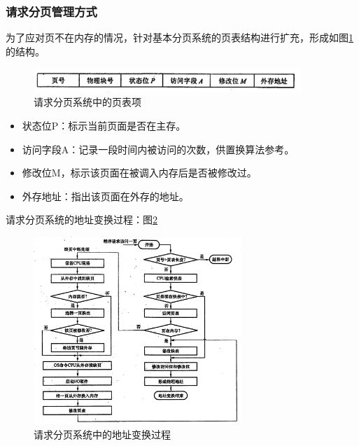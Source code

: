 \documentclass[12pt, a4paper, oneside]{ctexart}
\begin{document}
\subsubsection{请求分页管理方式}

为了应对页不在内存的情况，针对基本分页系统的页表结构进行扩充，形成如图\ref{page_request_system}的结构。

\begin{figure}[h]
  \centering
  \includegraphics[width=0.9\textwidth]{./images/page_request_system.png}
  \caption{请求分页系统中的页表项}
  \label{page_request_system}
\end{figure}

\begin{itemize}
  \item 状态位P：标示当前页面是否在主存。
  \item 访问字段A：记录一段时间内被访问的次数，供置换算法参考。
  \item 修改位M，标示该页面在被调入内存后是否被修改过。
  \item 外存地址：指出该页面在外存的地址。
\end{itemize}

请求分页系统的地址变换过程：图\ref{page_request_address_translation}

\begin{figure}
  \centering
  \includegraphics[width=0.7\textwidth]{./images/page_request_address_translation.png}
  \caption{请求分页系统中的地址变换过程}
  \label{page_request_address_translation}
\end{figure}
\end{document}
